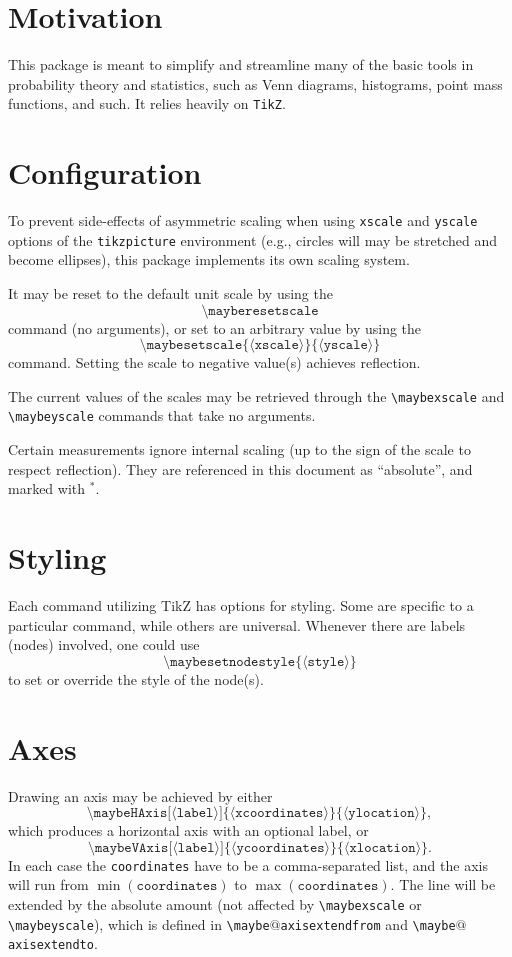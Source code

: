 \documentclass{article}
\newcommand{\command}[1]{\texttt{\textbackslash #1}}
\newcommand{\param}[1]{$\langle${#1}$\rangle$}
\newcommand{\Absolute}{${}^*$}
\begin{document}
\section{Motivation}
This package is meant to simplify and streamline many of the basic tools in probability theory and statistics, such as Venn diagrams, histograms, point mass functions, and such.
It relies heavily on \texttt{TikZ}.

\section{Configuration}
To prevent side-effects of asymmetric scaling when using \texttt{xscale} and \texttt{yscale} options of the \texttt{tikzpicture} environment (e.g., circles will may be stretched and become ellipses), this package implements its own scaling system.

It may be reset to the default unit scale by using the
\[
    \command{mayberesetscale}
\]
command (no arguments), or set to an arbitrary value by using the
\[
    \command{maybesetscale\{\param{xscale}\}\{\param{yscale}\}}
\]
command.
Setting the scale to negative value(s) achieves reflection.

The current values of the scales may be retrieved through the \command{maybexscale} and \command{maybeyscale} commands that take no arguments.

Certain measurements ignore internal scaling (up to the sign of the scale to respect reflection).
They are referenced in this document as ``absolute'', and marked with \texttt{\Absolute}.


\section{Styling}
Each command utilizing TikZ has options for styling.
Some are specific to a particular command, while others are universal.
Whenever there are labels (nodes) involved, one could use
\[
    \command{maybesetnodestyle\{\param{style}\}}
\]
to set or override the style of the node(s).

\section{Axes}
Drawing an axis may be achieved by either
\[
    \command{maybeHAxis[\param{label}]\{\param{xcoordinates}\}\{\param{ylocation}\}},
\]
which produces a horizontal axis with an optional label, or
\[
    \command{maybeVAxis[\param{label}]\{\param{ycoordinates}\}\{\param{xlocation}\}}.
\]
In each case the \texttt{coordinates} have to be a comma-separated list, and the axis will run from $\min(\texttt{coordinates})$ to $\max(\texttt{coordinates})$.
The line will be extended by the absolute amount (not affected by \command{maybexscale} or \command{maybeyscale}), which is defined in \command{maybe$@$axisextendfrom} and \command{maybe$@$axisextendto}.
\end{document}
